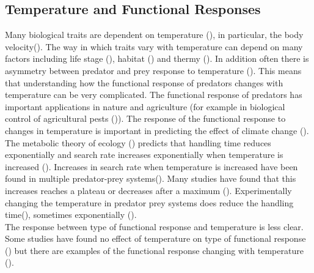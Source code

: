 \documentclass{article}
\begin{document}
\subsection{Temperature and Functional Responses}
Many biological traits are dependent on temperature (\cite{Dell2014TemperatureStrategy,Dell2011SystematicTraits}), in particular, the body velocity(\cite{Dell2014TemperatureStrategy}). The way in which traits vary with temperature can depend on many factors including life stage (\cite{Cator2019MoreResearch}), habitat (\cite{Dell2011SystematicTraits}) and thermy (\cite{Dell2014TemperatureStrategy}). In addition often there is asymmetry between predator and prey response to temperature (\cite{Dell2014TemperatureStrategy}). This means that understanding how the functional response of predators changes with temperature can be very complicated. The functional response of predators has important applications in nature and agriculture (for example in biological control of agricultural pests (\cite{Gilioli2005TemperatureIndividuals})). The response of the functional response to changes in temperature is important in predicting the effect of climate change (\cite{Ohlund2014TemperaturePrey}).  \\
The metabolic theory of ecology (\cite{Brown2004TowardEcology}) predicts that handling time reduces exponentially and search rate increases exponentially when temperature is increased (\cite{Dell2014TemperatureStrategy}). Increases in search rate when temperature is increased have been found in multiple predator-prey systems(\cite{Gilioli2005TemperatureIndividuals,Zamani2006Temperature-dependentAphid}). Many studies have found that this increases reaches a plateau or decreases after a maximum (\cite{Thompson1978TowardsElegans,Zamani2006Temperature-dependentAphid,Sentis2012UsingEfficiency}). Experimentally changing the temperature in predator prey systems does reduce the handling time(\cite{Thompson1978TowardsElegans,McCoull1998EffectNaucoridae,Jalali2010EffectPersicae,Zamani2006Temperature-dependentAphid}), sometimes exponentially (\cite{Sentis2012UsingEfficiency,}). \\
The response between type of functional response and temperature is less clear. Some studies have found no effect of temperature on type of functional response  (\cite{Sentis2012UsingEfficiency}) but there are examples of the functional response changing with temperature (\cite{Taylor2003EffectAmericanus}).
\end{document}
